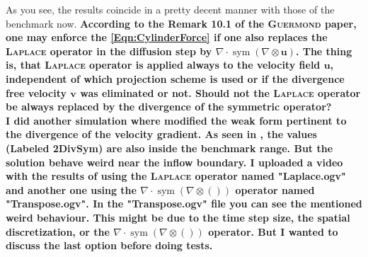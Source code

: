 \documentclass[]{scrartcl}
\newcommand{\bs}[1]{\boldsymbol{#1}}
\DeclareMathOperator{\Sym}{sym}
\begin{document}
As you see, the results coincide in a pretty decent manner with those of the benchmark now. \textbf{According to the Remark 10.1 of the \textsc{Guermond} paper, one may enforce the \cref{Eqn:CylinderForce} if one also replaces the \textsc{Laplace} operator in the diffusion step by $\nabla \cdot \Sym (\nabla \otimes \bs{u})$. The thing is, that \textsc{Laplace} operator is applied always to the velocity field $\bs{u}$, independent of which projection scheme is used or if the divergence free velocity $\bs{v}$ was eliminated or not. Should not the \textsc{Laplace} operator be always replaced by the divergence of the symmetric operator?\\
I did another simulation where modified the weak form pertinent to the divergence of the velocity gradient. As seen in , the values (Labeled 2DivSym) are also inside the benchmark range. But the solution behave weird near the inflow boundary. I uploaded a video with the results of using the \textsc{Laplace} operator named "Laplace.ogv" and another one using the $\nabla \cdot \Sym (\nabla \otimes ())$ operator named "Transpose.ogv". In the  "Transpose.ogv" file you can see the mentioned weird behaviour. This might be due to the time step size, the spatial discretization, or the $\nabla \cdot \Sym (\nabla \otimes ())$ operator. But I wanted to discuss the last option before doing tests.}
\end{document}
